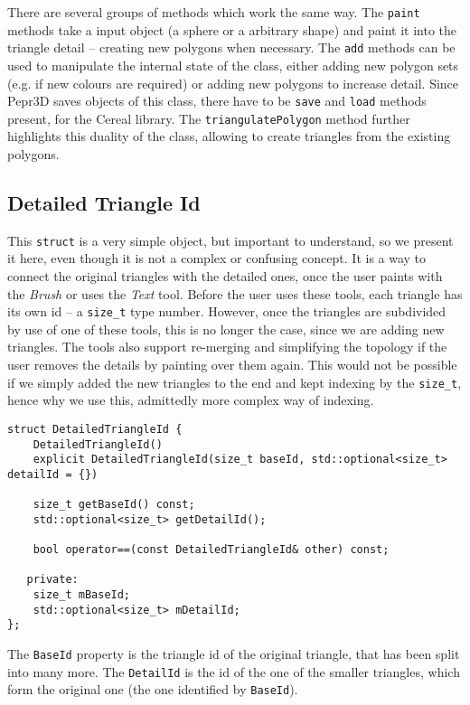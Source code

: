 There are several groups of methods which work the same way. The \texttt{paint} methods take a input object (a sphere or a arbitrary shape) and paint it into the triangle detail -- creating new polygons when necessary. The \texttt{add} methods can be used to manipulate the internal state of the class, either adding new polygon sets (e.g. if new colours are required) or adding new polygons to increase detail. Since Pepr3D saves objects of this class, there have to be \texttt{save} and \texttt{load} methods present, for the Cereal library. The \texttt{triangulatePolygon} method further highlights this duality of the class, allowing to create triangles from the existing polygons.

\subsection{Detailed Triangle Id}

This \texttt{struct} is a very simple object, but important to understand, so we present it here, even though it is not a complex or confusing concept. It is a way to connect the original triangles with the detailed ones, once the user paints with the \textit{Brush} or uses the \textit{Text} tool. Before the user uses these tools, each triangle has its own id -- a \texttt{size\_t} type number. However, once the triangles are subdivided by use of one of these tools, this is no longer the case, since we are adding new triangles. The tools also support re-merging and simplifying the topology if the user removes the details by painting over them again. This would not be possible if we simply added the new triangles to the end and kept indexing by the \texttt{size\_t}, hence why we use this, admittedly more complex way of indexing.

\begin{lstlisting}
struct DetailedTriangleId {
    DetailedTriangleId()
    explicit DetailedTriangleId(size_t baseId, std::optional<size_t> detailId = {})

    size_t getBaseId() const;
    std::optional<size_t> getDetailId();

    bool operator==(const DetailedTriangleId& other) const;

   private:
    size_t mBaseId;
    std::optional<size_t> mDetailId;
};
\end{lstlisting}

The \texttt{BaseId} property is the triangle id of the original triangle, that has been split into many more. The \texttt{DetailId} is the id of the one of the smaller triangles, which form the original one (the one identified by \texttt{BaseId}).

